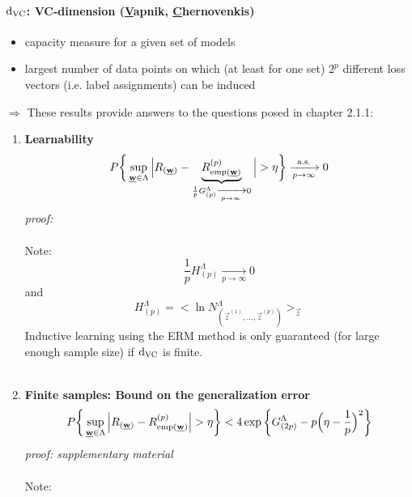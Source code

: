 \paragraph{$\mathrm{d}_{\mathrm{VC}}$: VC-dimension (\underline{V}apnik, \underline{C}hernovenkis)}
\begin{itemize}
	\item capacity measure for a given set of models 
	\item largest number of data points on which (at least for one set) 
		$2^p$ different loss vectors (i.e. label assignments) can be 
		induced
\end{itemize}
$\Rightarrow$ These results provide answers to the questions posed in chapter 2.1.1:
\begin{enumerate}[(1)]
\item {\bf Learnability} 
\begin{equation}
	P \bigg\{ \sup_{\underline{\mathbf{w}} \in \Lambda} \Big| R_{(\underline{\mathbf{w}})}
		- \underbrace{ R_{\operatorname{emp} (\underline{\mathbf{w}})}^{(p)} }_{
			\frac{1}{p} G_{(p)}^\Lambda 
			\xrightarrow[p \rightarrow \infty]{} 0}
		\Big| > \eta	\bigg\} 
		\xrightarrow[p \rightarrow \infty]{\text{a.s.}} 0
\end{equation}
{\it proof: \textcite[ch.~14]{Vapnik1998}}
\\\\
Note: 
\begin{equation} \tag{original proof}
	\frac{1}{p} H_{(p)}^\Lambda \xrightarrow[p \rightarrow \infty]{} 0
\end{equation}
and
\begin{equation} \tag{'entropy'}
	H_{(p)}^\Lambda = \Big< \ln 
		N_{(\vec{z}^{(1)}, \ldots, \vec{z}^{(p)})}^{\Lambda} 
		\Big>_{\vec{z}}
\end{equation}
Inductive learning using the ERM method is only guaranteed (for large enough sample size) if $\mathrm{d}_{\mathrm{VC}}$ is finite. 
\\\\
\item {\bf Finite samples: Bound on the generalization error}
\begin{equation}
	P \bigg\{ \sup_{\underline{\mathbf{w}} \in \Lambda} \Big| R_{(\underline{\mathbf{w}})}
		- R_{\operatorname{emp} (\underline{\mathbf{w}})}^{(p)} \Big| > \eta \bigg\}
	< 4 \exp \bigg\{ G_{(2p)}^\Lambda - p 
		\Big( \eta -\frac{1}{p} \Big)^2 \bigg\}
\end{equation}
{\it proof: supplementary material}
\\\\
Note:
\begin{equation} \tag{original proof}

\end{equation}
\end{enumerate}
